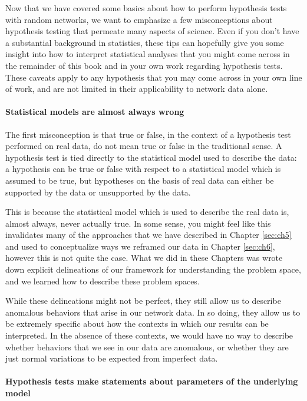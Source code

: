 Now that we have covered some basics about how to perform hypothesis tests with random networks, we want to emphasize a few misconceptions about hypothesis testing that permeate many aspects of science. Even if you don't have a substantial background in statistics, these tips can hopefully give you some insight into how to interpret statistical analyses that you might come across in the remainder of this book and in your own work regarding hypothesis tests. These caveats apply to any hypothesis that you may come across in your own line of work, and are not limited in their applicability to network data alone.

\paragraph*{Statistical models are almost always wrong}

The first misconception is that true or false, in the context of a hypothesis test performed on real data, do not mean true or false in the traditional sense. A hypothesis test is tied directly to the statistical model used to describe the data: a hypothesis can be true or false with respect to a statistical model which is assumed to be true, but hypotheses on the basis of real data can either be supported by the data or unsupported by the data. 

This is because the statistical model which is used to describe the real data is, almost always, never actually true. In some sense, you might feel like this invalidates many of the approaches that we have described in Chapter \ref{sec:ch5} and used to conceptualize ways we reframed our data in Chapter \ref{sec:ch6}, however this is not quite the case. What we did in these Chapters was wrote down explicit delineations of our framework for understanding the problem space, and we learned how to describe these problem spaces.

While these delineations might not be perfect, they still allow us to describe anomalous behaviors that arise in our network data. In so doing, they allow us to be extremely specific about how the contexts in which our results can be interpreted. In the absence of these contexts, we would have no way to describe whether behaviors that we see in our data are anomalous, or whether they are just normal variations to be expected from imperfect data.

\paragraph*{Hypothesis tests make statements about parameters of the underlying model}

